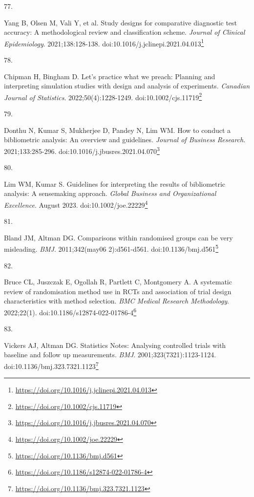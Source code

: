 \documentclass[
]{book}
\newlength{\cslhangindent}
\newlength{\csllabelwidth}
\newlength{\cslentryspacingunit} %
\newenvironment{CSLReferences}[2] %
 {%
  \setlength{\parindent}{0pt}
  \ifodd #1
  \let\oldpar\par
  \def\par{\hangindent=\cslhangindent\oldpar}
  \fi
  \setlength{\parskip}{#2\cslentryspacingunit}
 }%
 {}
\newcommand{\CSLLeftMargin}[1]{\parbox[t]{\csllabelwidth}{#1}}
\newcommand{\CSLRightInline}[1]{\parbox[t]{\linewidth - \csllabelwidth}{#1}\break}
\renewcommand{\href}[2]{#2\footnote{\url{#1}}}
\begin{document}
\begin{CSLReferences}{0}{0}
\leavevmode{}%
\CSLLeftMargin{77. }%
\CSLRightInline{Yang B, Olsen M, Vali Y, et al. Study designs for comparative diagnostic test accuracy: A methodological review and classification scheme. \emph{Journal of Clinical Epidemiology}. 2021;138:128-138. doi:\href{https://doi.org/10.1016/j.jclinepi.2021.04.013}{10.1016/j.jclinepi.2021.04.013}}

\leavevmode{}%
\CSLLeftMargin{78. }%
\CSLRightInline{Chipman H, Bingham D. Let's practice what we preach: Planning and interpreting simulation studies with design and analysis of experiments. \emph{Canadian Journal of Statistics}. 2022;50(4):1228-1249. doi:\href{https://doi.org/10.1002/cjs.11719}{10.1002/cjs.11719}}

\leavevmode{}%
\CSLLeftMargin{79. }%
\CSLRightInline{Donthu N, Kumar S, Mukherjee D, Pandey N, Lim WM. How to conduct a bibliometric analysis: An overview and guidelines. \emph{Journal of Business Research}. 2021;133:285-296. doi:\href{https://doi.org/10.1016/j.jbusres.2021.04.070}{10.1016/j.jbusres.2021.04.070}}

\leavevmode{}%
\CSLLeftMargin{80. }%
\CSLRightInline{Lim WM, Kumar S. Guidelines for interpreting the results of bibliometric analysis: A sensemaking approach. \emph{Global Business and Organizational Excellence}. August 2023. doi:\href{https://doi.org/10.1002/joe.22229}{10.1002/joe.22229}}

\leavevmode{}%
\CSLLeftMargin{81. }%
\CSLRightInline{Bland JM, Altman DG. Comparisons within randomised groups can be very misleading. \emph{BMJ}. 2011;342(may06 2):d561-d561. doi:\href{https://doi.org/10.1136/bmj.d561}{10.1136/bmj.d561}}

\leavevmode{}%
\CSLLeftMargin{82. }%
\CSLRightInline{Bruce CL, Juszczak E, Ogollah R, Partlett C, Montgomery A. A systematic review of randomisation method use in RCTs and association of trial design characteristics with method selection. \emph{BMC Medical Research Methodology}. 2022;22(1). doi:\href{https://doi.org/10.1186/s12874-022-01786-4}{10.1186/s12874-022-01786-4}}

\leavevmode{}%
\CSLLeftMargin{83. }%
\CSLRightInline{Vickers AJ, Altman DG. Statistics Notes: Analysing controlled trials with baseline and follow up measurements. \emph{BMJ}. 2001;323(7321):1123-1124. doi:\href{https://doi.org/10.1136/bmj.323.7321.1123}{10.1136/bmj.323.7321.1123}}


\end{CSLReferences}
\end{document}
